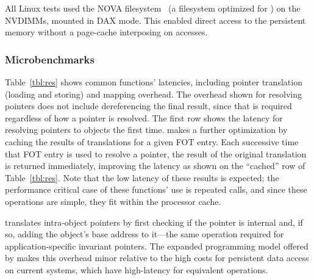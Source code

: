 All Linux tests used the NOVA filesystem~\cite{Xu:nova} (a filesystem
optimized for \NVM) on the NVDIMMs, mounted in DAX mode. This enabled direct access to the
persistent memory without a page-cache interposing on accesses.

\subsubsection{Microbenchmarks}

Table~\ref{tbl:res} shows common \Twizzler functions' latencies, including pointer
translation (loading and storing) and mapping overhead.
The overhead shown for resolving pointers does not
include dereferencing the final result, since that is required regardless of how a pointer is
resolved. The first row shows the latency for resolving pointers to objects the first time.
\Twizzler makes a further optimization by
caching the results of translations for a given FOT entry. Each successive
time that FOT entry is used to resolve a pointer, the result of the original translation is returned
immediately, improving the latency as shown on the ``cached'' row of Table~\ref{tbl:res}. Note that
the low latency of these results is expected; the performance critical case of these functions' use
is repeated calls, and since these operations are simple, they fit within the processor cache.

\Twizzler translates intra-object pointers by first
checking if the pointer is internal and, if so, adding the object's base
address to it---the same operation required for application-specific
invariant pointers. The expanded programming model offered by \Twizzler
makes this overhead minor relative to the high costs for persistent data access on
current systems, which have high-latency for equivalent operations.

